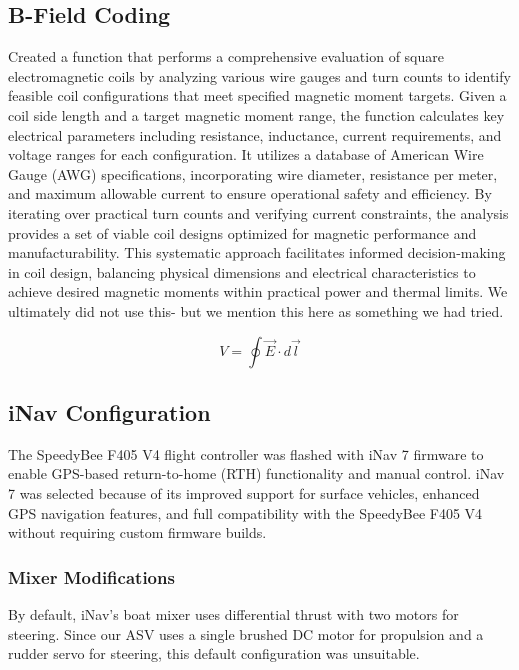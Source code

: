 \subsection{B-Field Coding}
Created a function that performs a comprehensive evaluation of square electromagnetic coils by analyzing various wire gauges and turn counts to identify feasible coil configurations that meet specified magnetic moment targets. Given a coil side length and a target magnetic moment range, the function calculates key electrical parameters including resistance, inductance, current requirements, and voltage ranges for each configuration. It utilizes a database of American Wire Gauge (AWG) specifications, incorporating wire diameter, resistance per meter, and maximum allowable current to ensure operational safety and efficiency. By iterating over practical turn counts and verifying current constraints, the analysis provides a set of viable coil designs optimized for magnetic performance and manufacturability. This systematic approach facilitates informed decision-making in coil design, balancing physical dimensions and electrical characteristics to achieve desired magnetic moments within practical power and thermal limits. We ultimately did not use this- but we mention this here as something we had tried.

\begin{equation}
V=\oint \overrightarrow{E}\cdot d\overrightarrow{l}  
\label{MyEquation}
\end{equation}

\subsection{iNav Configuration}

The SpeedyBee F405 V4 flight controller was flashed with iNav 7 firmware to enable GPS-based return-to-home (RTH) functionality and manual control. iNav 7 was selected because of its improved support for surface vehicles, enhanced GPS navigation features, and full compatibility with the SpeedyBee F405 V4 without requiring custom firmware builds.

\subsubsection*{Mixer Modifications}

By default, iNav's boat mixer uses differential thrust with two motors for steering. Since our ASV uses a single brushed DC motor for propulsion and a rudder servo for steering, this default configuration was unsuitable.

